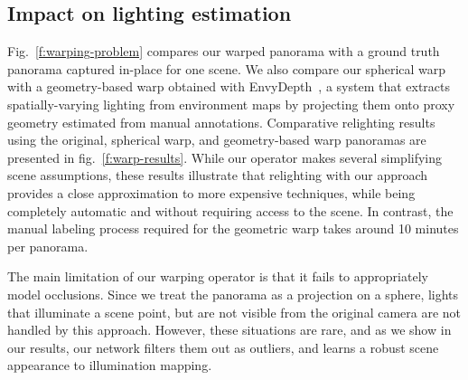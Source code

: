 \subsection{Impact on lighting estimation}

Fig.~\ref{f:warping-problem} compares our warped panorama with a ground truth panorama captured in-place for one scene. We also compare our spherical warp with a geometry-based warp obtained with EnvyDepth~\cite{banterle-cgf-13}, a system that extracts spatially-varying lighting from environment maps by projecting them onto proxy geometry estimated from manual annotations. Comparative relighting results using the original, spherical warp, and geometry-based warp panoramas are presented in fig.~\ref{f:warp-results}. While our operator makes several simplifying scene assumptions, these results illustrate that relighting with our approach provides a close approximation to more expensive techniques, while being completely automatic and without requiring access to the scene. In contrast, the manual labeling process required for the geometric warp takes around 10 minutes per panorama. 

The main limitation of our warping operator is that it fails to appropriately model occlusions. Since we treat the panorama as a projection on a sphere, lights that illuminate a scene point, but are not visible from the original camera are not handled by this approach. However, these situations are rare, and as we show in our results, our network filters them out as outliers, and learns a robust scene appearance to illumination mapping.





